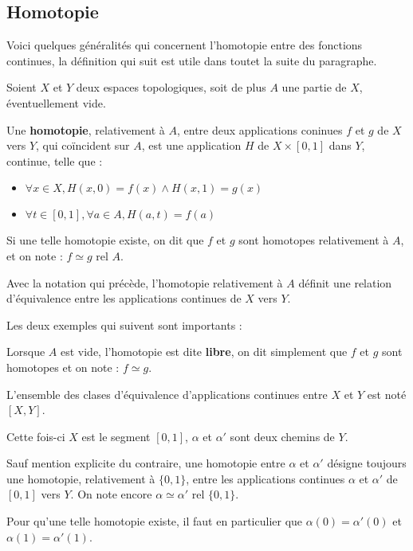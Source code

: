 \subsection{Homotopie}

Voici quelques g\'en\'eralit\'es qui concernent l'homotopie entre des fonctions continues, la d\'efinition qui suit est utile dans toutet la suite du paragraphe.

\begin{defi}
Soient $X$ et $Y$ deux espaces topologiques, soit de plus $A$ une partie de $X$, \'eventuellement vide.

Une \textbf{homotopie}, relativement \`a $A$, entre deux applications coninues $f$ et $g$ de $X$ vers $Y$, %
qui co\"incident sur $A$, %
est une application $H$ de $X\times [0,1]$ dans $Y$, continue, telle que :
\begin{itemize}
\item $\forall x \in X, H(x,0)=f(x) \wedge H(x,1)=g(x)$
\item $\forall t \in [0,1] , \forall a \in A , H(a,t)=f(a)$
\end{itemize}
Si une telle homotopie existe, on dit que $f$ et $g$ sont homotopes relativement \`a $A$, %
et on note : $f\simeq g \text{ rel } A$.
\end{defi}

\begin{prop}
Avec la notation qui pr\'ec\`ede, l'homotopie relativement \`a $A$ d\'efinit une relation d'\'equivalence entre les applications continues de $X$ vers $Y$.
\end{prop}

Les deux exemples qui suivent sont importants :

\begin{exem}
Lorsque $A$ est vide, l'homotopie est dite \textbf{libre}, on dit simplement que $f$ et $g$ sont homotopes et on note : $f\simeq g$.

L'ensemble des clases d'\'equivalence d'applications continues entre $X$ et $Y$ est not\'e $[X,Y]$.
\end{exem}

\begin{exem}
Cette fois-ci $X$ est le segment $[0,1]$, $\alpha$ et $\alpha '$ sont deux chemins de $Y$.

Sauf mention explicite du contraire, une homotopie entre $\alpha$ et $\alpha '$ d\'esigne toujours une homotopie, relativement \`a $\{0,1\}$, %
entre les applications continues $\alpha$ et $\alpha '$ de $[0,1]$ vers $Y$. On note encore $\alpha\simeq\alpha ' \text{ rel }\{0,1\}$.

Pour qu'une telle homotopie existe, il faut en particulier que $\alpha(0)=\alpha '(0)$ et $\alpha(1)=\alpha '(1)$.
\end{exem}

